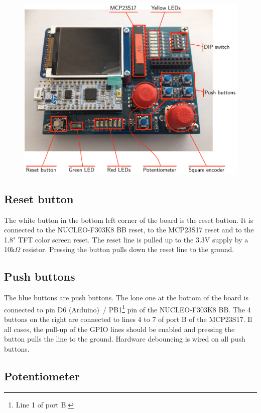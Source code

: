 \documentclass[11pt]{report}
\begin{document}
\begin{figure}[htbp] %
   \centering
   \includegraphics[scale=.7]{img/board.pdf} 
   \label{pic:board}
\end{figure}

\subsection{Reset button}

The white button in the bottom left corner of the board is the reset button. It is connected to the NUCLEO-F303K8 BB reset, to the MCP23S17 reset and to the 1.8" TFT color screen reset. The reset line is pulled up to the 3.3V supply by a 10k$\Omega$ resistor. Pressing the button pulls down the reset line to the ground.

\subsection{Push buttons}

The blue buttons are push buttons. The lone one at the bottom of the board is connected to pin D6 (Arduino)~/ PB1\footnote{Line 1 of port B.} pin of the NUCLEO-F303K8 BB. The 4 buttons on the right are connected to lines 4 to 7 of port B of the MCP23S17. Il all cases, the pull-up of the GPIO lines should be enabled and pressing the button pulls the line to the ground. Hardware debouncing is wired on all push buttons.

\subsection{Potentiometer}
\end{document}
